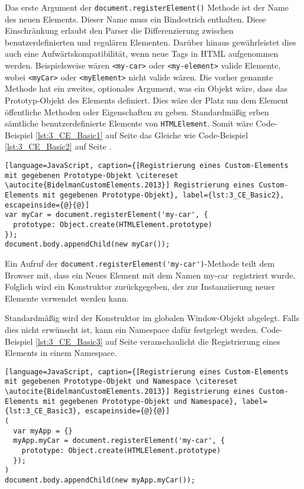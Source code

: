 Das erste Argument der \lstinline|document.registerElement()| Methode ist der Name des neuen Elements. Dieser Name muss ein Bindestrich enthalten. Diese Einschränkung erlaubt den Parser die Differenzierung zwischen benutzerdefinierten und regulären Elementen. Darüber hinaus gewährleistet dies auch eine Aufwärtskompatibilität, wenn neue Tags in HTML aufgenommen werden. Beispielsweise wären \lstinline|<my-car>| oder \lstinline|<my-element>| valide Elemente, wobei \lstinline|<myCar>| oder \lstinline|<myElement>| nicht valide wären. Die vorher genannte Methode hat ein zweites, optionales Argument, was ein Objekt wäre, dass das Prototyp-Objekt des Elements definiert. Dies wäre der Platz um dem Element öffentliche Methoden oder Eigenschaften zu geben. Standardmäßig erben sämtliche benutzerdefinierte Elemente von \lstinline|HTMLElement|. Somit wäre Code-Beispiel \ref{lst:3_CE_Basic1} auf Seite \pageref{lst:3_CE_Basic1} das Gleiche wie Code-Beispiel \ref{lst:3_CE_Basic2} auf Seite \pageref{lst:3_CE_Basic2}.

\begin{lstlisting}[language=JavaScript, caption={[Registrierung eines Custom-Elements mit gegebenen Prototype-Objekt \citereset \autocite{BidelmanCustomElements.2013}] Registrierung eines Custom-Elements mit gegebenen Prototype-Objekt}, label={lst:3_CE_Basic2}, escapeinside={@}{@}]
var myCar = document.registerElement('my-car', {
  prototype: Object.create(HTMLElement.prototype)
});
document.body.appendChild(new myCar());
\end{lstlisting}

Ein Aufruf der \lstinline|document.registerElement('my-car')|-Methode teilt dem Browser mit, dass ein Neues Element mit dem Namen \glqq my-car\grqq\ registriert wurde. Folglich wird ein Konstruktor zurückgegeben, der zur Instanziierung neuer Elemente verwendet werden kann.

Standardmäßig wird der Konstruktor im globalen Window-Objekt abgelegt. Falls dies nicht erwünscht ist, kann ein Namespace dafür festgelegt werden. Code-Beispiel \ref{lst:3_CE_Basic3} auf Seite \pageref{lst:3_CE_Basic3} veranschaulicht die Registrierung eines Elements in einem Namespace.

\begin{lstlisting}[language=JavaScript, caption={[Registrierung eines Custom-Elements mit gegebenen Prototype-Objekt und Namespace \citereset \autocite{BidelmanCustomElements.2013}] Registrierung eines Custom-Elements mit gegebenen Prototype-Objekt und Namespace}, label={lst:3_CE_Basic3}, escapeinside={@}{@}]
(
  var myApp = {}
  myApp.myCar = document.registerElement('my-car', {
    prototype: Object.create(HTMLElement.prototype)
  });
)
document.body.appendChild(new myApp.myCar());
\end{lstlisting}

